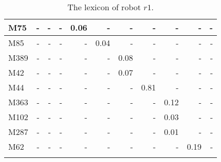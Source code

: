 \begin{table}[h]
{\begin{tabular}{ld{2}d{2}d{2}d{2}d{2}d{2}d{2}d{2}d{2}d{2}}
M75 & - & - & - & 0.06 & - & - & - & - & - & -\\\hline
M85 & - & - & - & - & 0.04 & - & - & - & - & -\\\hline
M389 & - & - & - & - & - & 0.08 & - & - & - & -\\\hline
M42 & - & - & - & - & - & 0.07 & - & - & - & -\\\hline
M44 & - & - & - & - & - & - & 0.81 & - & - & -\\\hline
M363 & - & - & - & - & - & - & - & 0.12 & - & -\\\hline
M102 & - & - & - & - & - & - & - & 0.03 & - & -\\\hline
M287 & - & - & - & - & - & - & - & 0.01 & - & -\\\hline
M62 & - & - & - & - & - & - & - & - & 0.19 & -\\
\lspbottomrule
\end{tabular}}
\caption{The lexicon of robot $r1$.}
\label{t:st:lexicon1}
\end{table}

